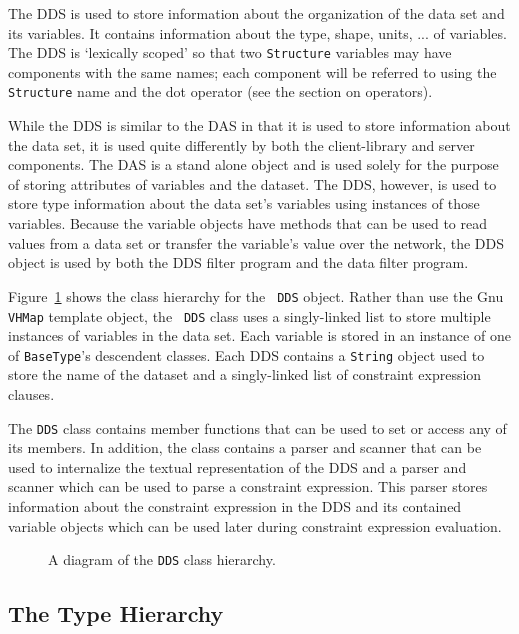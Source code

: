 The DDS is used to store information about the organization of the data set
and its variables. It contains information about the type, shape, units, ...
of variables. The DDS is `lexically scoped' so that two {\tt Structure}
variables may have components with the same names; each component will be
referred to using the {\tt Structure} name and the dot operator (see the \Dap
section on operators).

While the DDS is similar to the DAS in that it is used to store
information about the data set, it is used quite differently by both the
client-library and server components. The DAS is a stand alone object and is
used solely for the purpose of storing attributes of variables and the
dataset. The DDS, however, is used to store type information about the
data set's variables using instances of those variables. Because the variable
objects have methods that can be used to read values from a data set or
transfer the variable's value over the network, the DDS object is used by
both the DDS filter program and the data filter program.

Figure~\ref{fig:dds-class-diagram} shows the class hierarchy for the {\tt
  DDS} object. Rather than use the Gnu {\tt VHMap} template object, the {\tt
  DDS} class uses a singly-linked list to store multiple instances of
variables in the data set. Each variable is stored in an instance of one of
{\tt BaseType}'s descendent classes. Each DDS contains a {\tt String} object
used to store the name of the dataset and a singly-linked list of constraint
expression clauses.

The {\tt DDS} class contains member functions that can be used to set or
access any of its members. In addition, the class contains a parser and
scanner that can be used to internalize the textual representation of the DDS
and a parser and scanner which can be used to parse a constraint expression.
This parser stores information about the constraint expression in the DDS and
its contained variable objects which can be used later during constraint
expression evaluation.

\begin{figure}
\centerline{}
\caption{A diagram of the {\tt DDS} class hierarchy.}
\label{fig:dds-class-diagram}
\end{figure}

\subsection{The Type Hierarchy}

